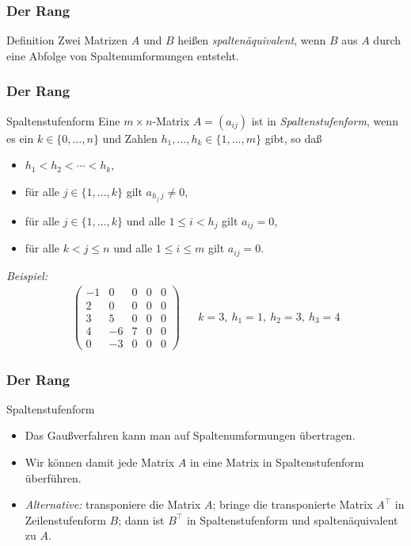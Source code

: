 \documentclass{beamer}
\renewcommand{\emph}[1]{{\textcolor{solarizedRed}{\itshape #1}}}
\newcommand{\trans}{\top}
\renewcommand{\ae}{\"a}
\renewcommand{\oe}{\"o}
\newcommand{\ue}{\"u}
\newcommand{\mytitle}{Der Rang}
\begin{document}
\begin{frame}\frametitle{\mytitle}
	\begin{block}{Definition}
		Zwei Matrizen $A$ und $B$ hei\ss en \emph{spalten\ae quivalent}, wenn $B$ aus $A$ durch eine Abfolge von Spaltenumformungen entsteht.	
	\end{block}
\end{frame}

\begin{frame}\frametitle{\mytitle}
	\begin{block}{Spaltenstufenform}
		Eine $m\times n$-Matrix $A=(a_{ij})$ ist in \emph{Spaltenstufenform}, wenn es ein $k\in\{0,\ldots,n\}$ und Zahlen $h_1,\ldots,h_k\in\{1,\ldots,m\}$ gibt, so da\ss
	\begin{itemize}
		\item $h_1<h_2<\cdots<h_k$,
		\item f\ue r alle $j\in\{1,\ldots,k\}$ gilt $a_{h_j\,j}\neq0$,
		\item f\ue r alle $j\in\{1,\ldots,k\}$ und alle $1\leq i<h_j$ gilt $a_{ij}=0$,
		\item f\ue r alle $k<j\leq n$ und alle $1\leq i\leq m$ gilt $a_{ij}=0$.
	\end{itemize}
	\emph{Beispiel:}
	\begin{align*}
	\begin{pmatrix}
		-1&0&0&0&0\\
		2&0&0&0&0\\
		3&5&0&0&0\\
		4&-6&7&0&0\\
		0&-3&0&0&0
	\end{pmatrix}&&
	k=3,\ h_1=1,\ h_2=3,\ h_3=4
	\end{align*}
	\end{block}
\end{frame}

\begin{frame}\frametitle{\mytitle}
	\begin{block}{Spaltenstufenform}
	\begin{itemize}
	\item Das Gau\ss verfahren kann man auf Spaltenumformungen \ue bertragen.
	\item Wir k\oe nnen damit jede Matrix $A$ in eine Matrix in Spaltenstufenform \ue berf\ue hren.
	\item \emph{Alternative:} transponiere die Matrix $A$; bringe die transponierte Matrix $A^\trans$ in Zeilenstufenform $B$; dann ist $B^\trans$ in Spaltenstufenform und spalten\ae quivalent zu $A$.
	\end{itemize}
	\end{block}
\end{frame}
\end{document}
